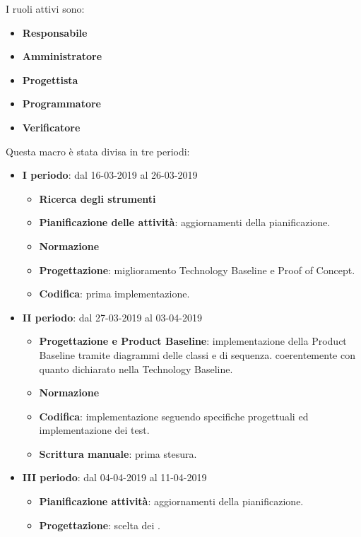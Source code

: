         I ruoli attivi sono: 
        \begin{itemize}
            \item \textbf{Responsabile}
            \item \textbf{Amministratore}
            \item \textbf{Progettista}
            \item \textbf{Programmatore}
            \item \textbf{Verificatore}
        \end{itemize}
        Questa macro è stata divisa in tre periodi:
		\begin{itemize}
			\item \textbf{I periodo}: dal 16-03-2019 al 26-03-2019
			\begin{itemize}
    	        \item \textbf{Ricerca degli strumenti}
    	        \item \textbf{Pianificazione delle attività}: aggiornamenti della pianificazione.
    	        \item \textbf{Normazione}
    	        \item \textbf{Progettazione}: miglioramento Technology Baseline e Proof of Concept.
    	        \item \textbf{Codifica}: prima implementazione.
        	\end{itemize}
			\item \textbf{II periodo}: dal 27-03-2019 al 03-04-2019
			\begin{itemize}
				\item \textbf{Progettazione e Product Baseline}: implementazione della Product Baseline tramite diagrammi delle classi e di sequenza.
				coerentemente con quanto dichiarato nella Technology Baseline.
    	        \item \textbf{Normazione}
    	        \item \textbf{Codifica}: implementazione seguendo specifiche progettuali ed implementazione dei test.
    	        \item \textbf{Scrittura manuale}: prima stesura.
        	\end{itemize}
        	\item \textbf{III periodo}: dal 04-04-2019 al 11-04-2019
			\begin{itemize}
				\item \textbf{Pianificazione attività}: aggiornamenti della pianificazione.
    	        \item \textbf{Progettazione}: scelta dei .

\end{itemize}
\end{itemize}
